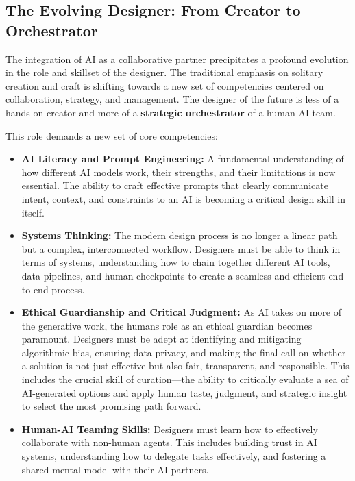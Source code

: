 \documentclass[
  12pt,
  a4paper,
  bibliography=totoc,
  numbers=noenddot
]{scrartcl}
\begin{document}
\subsection{The Evolving Designer: From
Creator to
Orchestrator}\label{the-evolving-designer-from-creator-to-orchestrator}

The integration of AI as a collaborative partner precipitates a profound
evolution in the role and skillset of the designer. The traditional
emphasis on solitary creation and craft is shifting towards a new set of
competencies centered on collaboration, strategy, and management. The
designer of the future is less of a hands-on creator and more of a
\textbf{strategic orchestrator} of a human-AI team.

This role demands a new set of core competencies:

\begin{itemize}
\item
  \textbf{AI Literacy and Prompt Engineering:} A fundamental
  understanding of how different AI models work, their strengths, and
  their limitations is now essential. The ability to craft effective
  prompts that clearly communicate intent, context, and constraints to
  an AI is becoming a critical design skill in
  itself.\cite{researchgate2025thinking}
\item
  \textbf{Systems Thinking:} The modern design process is no longer a
  linear path but a complex, interconnected workflow. Designers must be
  able to think in terms of systems, understanding how to chain together
  different AI tools, data pipelines, and human checkpoints to create a
  seamless and efficient end-to-end process.\cite{uxdesign2025why}
\item
  \textbf{Ethical Guardianship and Critical Judgment:} As AI takes on
  more of the generative work, the human\textquotesingle s role as an
  ethical guardian becomes paramount. Designers must be adept at
  identifying and mitigating algorithmic bias, ensuring data privacy,
  and making the final call on whether a solution is not just effective
  but also fair, transparent, and responsible.\cite{forrester2025design} This
  includes the crucial skill of curation---the ability to critically
  evaluate a sea of AI-generated options and apply human taste,
  judgment, and strategic insight to select the most promising path
  forward.
\item
  \textbf{Human-AI Teaming Skills:} Designers must learn how to
  effectively collaborate with non-human agents. This includes building
  trust in AI systems, understanding how to delegate tasks effectively,
  and fostering a shared mental model with their AI
  partners.\cite{pmc2025defining}
\end{itemize}
\end{document}

